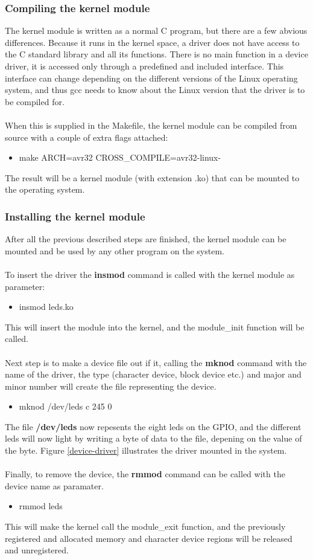 \subsubsection{Compiling the kernel module}
The kernel module is written as a normal C program, but there are a few
abvious differences. Because it runs in the kernel space, a driver
does not have access to the C standard library and all its functions. 
There is no main function in a device driver, it is accessed only 
through a predefined and included interface. This interface can change 
depending on the different versions of the Linux operating system, and
thus gcc needs to know about the Linux version that the driver is to be
compiled for.\\
\\
When this is supplied in the Makefile, the kernel module can be compiled
from source with a couple of extra flags attached:
\begin{itemize}
  \item make ARCH=avr32 CROSS\_COMPILE=avr32-linux-
\end{itemize}
The result will be a kernel module (with extension .ko) that can be
mounted to the operating system.

\subsubsection{Installing the kernel module}
After all the previous described steps are finished, the kernel 
module can be mounted and be used by any other program on the system.\\
\\
To insert the driver the \textbf{insmod} command is called with the 
kernel module as parameter:
\begin{itemize}
  \item insmod leds.ko
\end{itemize}
This will insert the module into the kernel, and the module\_init
function will be called.\\
\\
Next step is to make a device file out if it, calling the 
\textbf{mknod} command with the name of the driver,
the type (character device, block device etc.) 
and major and minor number will create the file representing the device.
\begin{itemize}
  \item mknod /dev/leds c 245 0
\end{itemize}
The file \textbf{/dev/leds} now repesents the eight leds on the GPIO,
and the different leds will now light by writing a byte
of data to the file, depening on the value of the byte. 
Figure \ref{device-driver} illustrates the driver mounted in the 
system.\\
\\
Finally, to remove the device, the \textbf{rmmod} command can be called
with the device name as paramater.
\begin{itemize}
  \item rmmod leds
\end{itemize}
This will make the kernel call the module\_exit function, and the 
previously registered and allocated memory and character device regions
will be released and unregistered.
